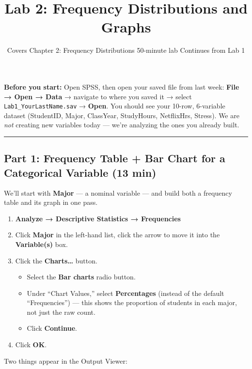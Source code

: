 \documentclass[
  11pt,
]{article}
\title{Lab 2: Frequency Distributions and Graphs}
\subtitle{Covers Chapter 2: Frequency Distributions \textbar{} 50-minute
lab \textbar{} Continues from Lab 1}
\author{}
\date{}
\providecommand{\tightlist}{%
  \setlength{\itemsep}{0pt}\setlength{\parskip}{0pt}}\usepackage{longtable,booktabs,array}
\begin{document}
\maketitle


\textbf{Before you start:} Open SPSS, then open your saved file from
last week: \textbf{File → Open → Data} → navigate to where you saved it
→ select \texttt{Lab1\_YourLastName.sav} → \textbf{Open}. You should see
your 10-row, 6-variable dataset (StudentID, Major, ClassYear,
StudyHours, NetflixHrs, Stress). We are \emph{not} creating new
variables today --- we're analyzing the ones you already built.

\begin{center}\rule{0.5\linewidth}{0.5pt}\end{center}

\subsection{Part 1: Frequency Table + Bar Chart for a Categorical
Variable (13
min)}\label{part-1-frequency-table-bar-chart-for-a-categorical-variable-13-min}

We'll start with \textbf{Major} --- a nominal variable --- and build
both a frequency table and its graph in one pass.

\begin{enumerate}
\def\labelenumi{\arabic{enumi}.}
\tightlist
\item
  \textbf{Analyze → Descriptive Statistics → Frequencies}
\item
  Click \textbf{Major} in the left-hand list, click the arrow to move it
  into the \textbf{Variable(s)} box.
\item
  Click the \textbf{Charts\ldots{}} button.

  \begin{itemize}
  \tightlist
  \item
    Select the \textbf{Bar charts} radio button.
  \item
    Under ``Chart Values,'' select \textbf{Percentages} (instead of the
    default ``Frequencies'') --- this shows the proportion of students
    in each major, not just the raw count.
  \item
    Click \textbf{Continue}.
  \end{itemize}
\item
  Click \textbf{OK}.
\end{enumerate}

Two things appear in the Output Viewer:
\end{document}
